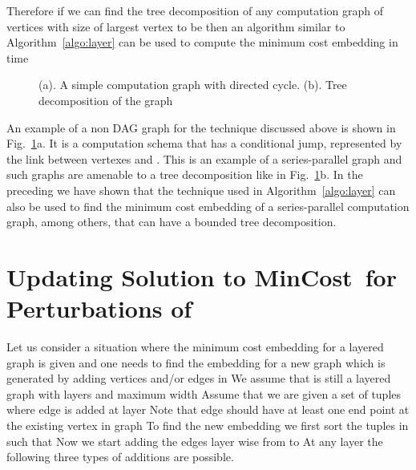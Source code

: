 \documentclass[journal]{IEEEtran}
\newcommand{\mincost}{\textsf{MinCost}}
\begin{document}
Therefore if we can find the tree decomposition of any computation
graph  of  vertices with size of largest vertex to be
 then an algorithm similar to Algorithm~\ref{algo:layer} can be
used to compute the minimum cost embedding in time 

\begin{figure}[tbp]
\centering
{}
\hspace*{10pt}
 \caption{(a). A simple computation graph with directed
    cycle. (b). Tree decomposition of the graph}
  \label{fig:series}
\end{figure}

An example of a non DAG graph for the technique discussed above is
shown in Fig.~\ref{fig:series}a. It is a computation
schema that has a conditional jump, represented by the link between
vertexes  and . This is an example of a series-parallel graph
\cite{Diestel00} and such graphs are amenable to a tree decomposition
like in Fig.~\ref{fig:series}b.  In the preceding we have shown that
the technique used in Algorithm~\ref{algo:layer} can also be used to
find the minimum cost embedding of a series-parallel computation
graph, among others, that can have a bounded tree decomposition.

\section{Updating Solution to \mincost\ for Perturbations of }
\label{sec:change_computation}

Let us consider a situation where the minimum cost embedding for a
layered graph  is given and one needs to find the
embedding for a new graph  which is generated by
adding vertices and/or edges in  We assume that
 is still a layered graph with  layers and
maximum width  Assume that we are given a set of  tuples
 where edge  is added at layer  Note that edge
 should have at least one end point at the existing vertex in
graph  To find the new embedding we first sort the 
tuples in  such that  Now we start adding the edges layer wise from 
to  At any layer  the following three types of additions are
possible.
\end{document}
